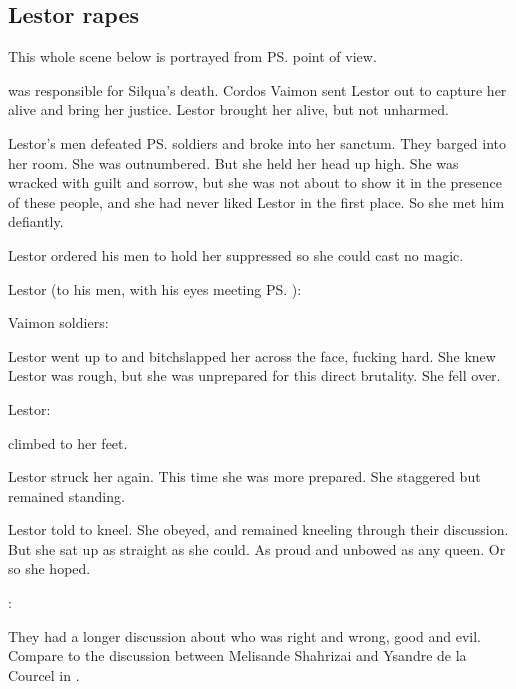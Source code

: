 \subsection{Lestor rapes \Delphine}
This whole scene below is portrayed from \ps{\Delphine} point of view. 

\Delphine{} was responsible for Silqua's death. 
Cordos Vaimon sent Lestor \Delaen out to capture her alive and bring her justice. 
Lestor brought her alive, but not unharmed. 

Lestor's men defeated \ps{\Delphine}{} soldiers and broke into her sanctum. 
They barged into her room. 
She was outnumbered. 
But she held her head up high. 
She was wracked with guilt and sorrow, but she was not about to show it in the presence of these people, and she had never liked Lestor in the first place. 
So she met him defiantly. 

Lestor ordered his men to hold her suppressed so she could cast no magic. 

Lestor (to his men, with his eyes meeting \ps{\Delphine}): 

Vaimon soldiers: 

Lestor went up to \Delphine{} and bitchslapped her across the face, fucking hard. 
She knew Lestor was rough, but she was unprepared for this direct brutality. 
She fell over. 

Lestor: 

\Delphine{} climbed to her feet. 

Lestor struck her again. 
This time she was more prepared. 
She staggered but remained standing. 

Lestor told \Delphine{} to kneel. 
She obeyed, and remained kneeling through their discussion. 
But she sat up as straight as she could. 
As proud and unbowed as any queen. 
Or so she hoped. 

\Delphine: 

They had a longer discussion about who was right and wrong, good and evil. 
Compare to the discussion between Melisande Shahrizai and Ysandre de la Courcel in \cite[p.622]{JacquelineCarey:KushielsAvatar}. 

